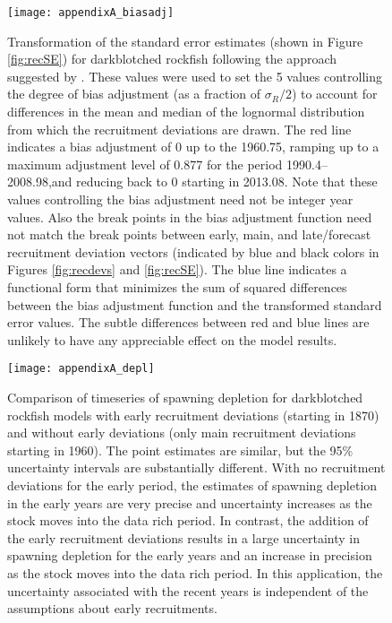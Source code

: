 \begin{figure}[H]
	\begin{center}
	\texttt{[image: appendixA\_biasadj]}\\
	\end{center}
	\caption{ Transformation of the standard error estimates (shown in Figure \ref{fig:recSE}) for darkblotched rockfish following the approach suggested by \citet{methot-adjusting-2011}. These values were used to set the 5 values controlling the degree of bias adjustment (as a fraction of  $\sigma_R/2$) to account for differences in the mean and median of the lognormal distribution from which the recruitment deviations are drawn. The red line indicates a bias adjustment of 0 up to the  1960.75, ramping up to a maximum adjustment level of 0.877 for the period 1990.4–2008.98,and reducing back to 0 starting in 2013.08. Note that these values controlling the bias adjustment need not be integer year values. Also the break points in the bias adjustment function need not match the break points between early, main, and late/forecast recruitment deviation vectors (indicated by blue and black colors in Figures \ref{fig:recdevs} and \ref{fig:recSE}). The blue line indicates a functional form that minimizes the sum of squared differences between the bias adjustment function and the transformed standard error values. The subtle differences between red and blue lines are unlikely to have any appreciable effect on the model results.}
	\label{fig:ramp}
\end{figure}


\begin{figure}[H]
	\begin{center}
	\texttt{[image: appendixA\_depl]}\\
	\end{center}
	\caption{ Comparison of timeseries of spawning depletion for darkblotched rockfish models with early recruitment deviations (starting in 1870) and without early deviations (only main recruitment deviations starting in 1960). The point estimates are similar, but the 95\% uncertainty intervals are substantially different. With no recruitment deviations for the early period, the estimates of spawning depletion in the early years are very precise and uncertainty increases as the stock moves into the data rich period. In contrast, the addition of the early recruitment deviations results in a large uncertainty in spawning depletion for the early years and an increase in precision as the stock moves into the data rich period. In this application, the uncertainty associated with the recent years is independent of the assumptions about early recruitments.}
\end{figure}

